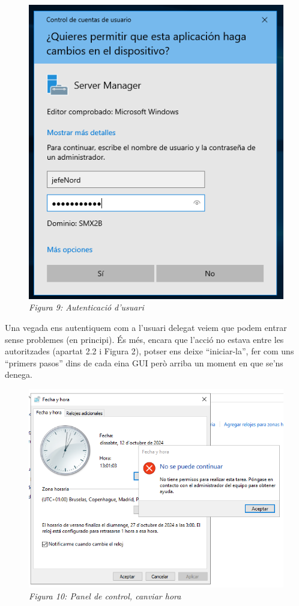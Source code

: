 \documentclass[
  a4paper,
]{article}
\begin{document}
\begin{figure}
\centering
\includegraphics{png/permisUsuariDelegat.png}
\caption{\emph{Figura 9: Autenticació d'usuari}}
\end{figure}

Una vegada ens autentiquem com a l'usuari delegat veiem que podem entrar
sense problemes (en principi). És més, encara que l'acció no estava
entre les autoritzades (apartat 2.2 i Figura 2), potser ens deixe
``iniciar-la'', fer com uns ``primers pasos'' dins de cada eina GUI però
arriba un moment en que se'ns denega.

\begin{figure}
\centering
\includegraphics{png/canviHoraNO.png}
\caption{\emph{Figura 10: Panel de control, canviar hora}}
\end{figure}
\end{document}
